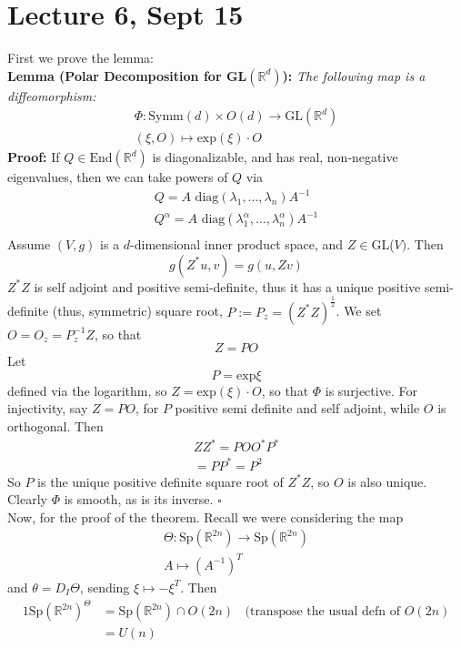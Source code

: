 \documentclass[12pt]{report}
\theoremstyle{definition}
\theoremstyle{remark}
\numberwithin{equation}{section}
\theoremstyle{definition}
\newcommand{\inv}[1]{#1^{-1}}
\newcommand{\bb}[1]{\mathbb{#1}}
\newcommand{\mqed}{\hfill\newline\null \hfill$\square$\\ }
\begin{document}
\section*{Lecture 6, Sept 15}
\label{sec:6}
First we prove the lemma: \\
\textbf{Lemma (Polar Decomposition for GL$(\bb R^d)$):}\textit{ The following map is a diffeomorphism: }
\begin{gather*}
	\Phi: \text{Symm}(d) \times O(d) \to \text{GL}(\bb R^d)\\
(\xi, O) \mapsto \text{exp}(\xi)\cdot O
\end{gather*}
\textbf{Proof: }If $Q \in \text{End}(\bb R^d)$ is diagonalizable, and has real, non-negative eigenvalues, then we can take powers of $Q$ via
\begin{gather*}
	Q = A \text{ diag}(\lambda_1,\dots,\lambda_n)\inv A\\
Q^\alpha = A \text{ diag}(\lambda_1^\alpha,\dots,\lambda_n^\alpha)\inv A\\
\end{gather*}
Assume $(V,g)$ is a $d$-dimensional inner product space, and $Z \in $GL($V)$. Then 
$$
	g(Z^*u,v) = g(u,Zv)
$$
$Z^*Z$ is self adjoint and positive semi-definite, thus it has a unique positive semi-definite (thus, symmetric) square root, $P := P_z = (Z^*Z)^{\frac{1}{2}}$. We set $O = O_z = \inv{P_z} Z$, so that 
$$
	Z = PO
$$
Let 
$$
		P = \text{exp}\xi
$$
defined via the logarithm, so $Z = \text{exp}(\xi)\cdot O$, so that $\Phi$ is surjective. For injectivity, say $Z = PO$, for $P$ positive semi definite and self adjoint, while $O$ is orthogonal. Then
\begin{gather*}
	ZZ^* = POO^*P^*\\
	= PP^* = P^2
\end{gather*}
So $P$ is the unique positive definite square root of $Z^*Z$, so $O$ is also unique. Clearly $\Phi$ is smooth, as is its inverse. \mqed
Now, for the proof of the theorem. Recall we were considering the map 
\begin{gather*}
	\Theta: \text{Sp}(\bb R^{2n}) \to \text{Sp}(\bb R^{2n}) \\
	A \mapsto (\inv A)^T
\end{gather*}
and $\theta = D_I \Theta$, sending $\xi \mapsto -\xi^T$. Then
\begin{alignat*}{1}
	\text{Sp}(\bb R^{2n})^\Theta &= \text{Sp}(\bb R^{2n}) \cap O(2n)\ \ \ \ \text{(transpose the usual defn of } O(2n)\\
	&= U(n)
\end{alignat*}
\end{document}

